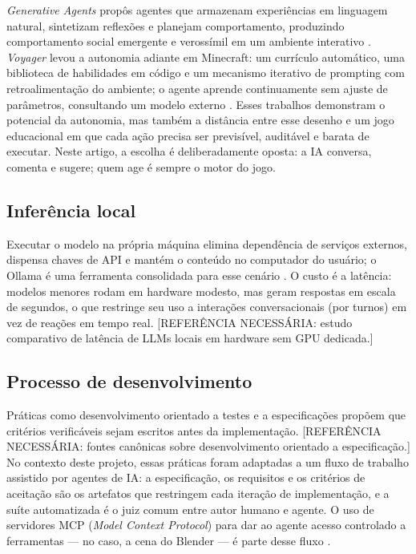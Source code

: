 \emph{Generative Agents} propôs agentes que armazenam experiências em linguagem
natural, sintetizam reflexões e planejam comportamento, produzindo
comportamento social emergente e verossímil em um ambiente interativo
\citep{park2023generative}. \emph{Voyager} levou a autonomia adiante em
Minecraft: um currículo automático, uma biblioteca de habilidades em código e
um mecanismo iterativo de prompting com retroalimentação do ambiente; o agente
aprende continuamente sem ajuste de parâmetros, consultando um modelo externo
\citep{wang2023voyager}. Esses trabalhos demonstram o potencial da autonomia,
mas também a distância entre esse desenho e um jogo educacional em que cada
ação precisa ser previsível, auditável e barata de executar. Neste artigo, a
escolha é deliberadamente oposta: a IA conversa, comenta e sugere; quem age é
sempre o motor do jogo.

\subsection{Inferência local}

Executar o modelo na própria máquina elimina dependência de serviços externos,
dispensa chaves de API e mantém o conteúdo no computador do usuário; o Ollama
é uma ferramenta consolidada para esse cenário \citep{ollama2026}. O custo é a
latência: modelos menores rodam em hardware modesto, mas geram respostas em
escala de segundos, o que restringe seu uso a interações conversacionais (por
turnos) em vez de reações em tempo real. [REFERÊNCIA NECESSÁRIA: estudo
comparativo de latência de LLMs locais em hardware sem GPU dedicada.]

\subsection{Processo de desenvolvimento}

Práticas como desenvolvimento orientado a testes e a especificações propõem
que critérios verificáveis sejam escritos antes da implementação.
[REFERÊNCIA NECESSÁRIA: fontes canônicas sobre desenvolvimento orientado a
especificação.] No contexto deste projeto, essas práticas foram adaptadas a um
fluxo de trabalho assistido por agentes de IA: a especificação, os requisitos e
os critérios de aceitação são os artefatos que restringem cada iteração de
implementação, e a suíte automatizada é o juiz comum entre autor humano e
agente. O uso de servidores MCP (\emph{Model Context Protocol}) para dar ao
agente acesso controlado a ferramentas --- no caso, a cena do Blender --- é
parte desse fluxo \citep{lab404repo}.

